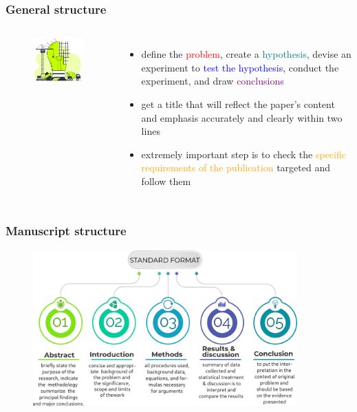 \documentclass[newPxFont,sthlmFooter]{beamer}
\newcommand{\fs}{\footnotesize}
\begin{document}
  \begin{frame}\frametitle{General structure}
    \begin{columns}[T,onlytextwidth]
    \begin{figure}
      \centering
      \includegraphics[width=2in]{figs/strc} 
    \end{figure}
    \begin{itemize}
    \fs
      \item define the \textcolor{red}{problem}, create a \textcolor{teal}{hypothesis}, devise an experiment to \textcolor{blue}{test the hypothesis}, conduct the experiment, and draw \textcolor{purple}{conclusions}
      \item get a title that will reflect the paper's content and emphasis accurately and clearly within two lines
      \item extremely important step is to check the \textcolor{orange}{specific requirements of the publication} targeted and follow them
    \end{itemize}
    \vspace{-2cm}
    \end{columns}
  \end{frame}

\begin{frame}\frametitle{Manuscript structure}
  \vspace{-0.5cm}
  \begin{figure}
    \centering
    \includegraphics[width=4in]{figs/chart} 
  \end{figure}
\end{frame}
\end{document}
